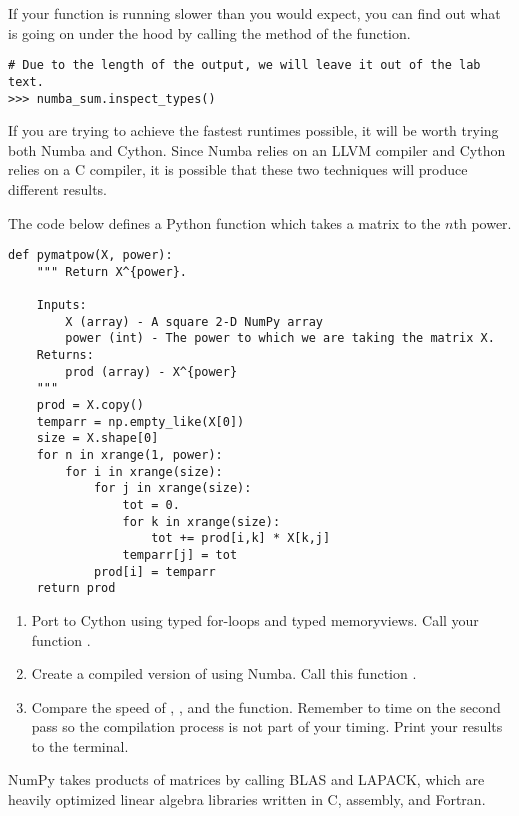 If your function is running slower than you would expect, you can find out what is going on under the hood by calling the  method of the function.

\begin{lstlisting}
# Due to the length of the output, we will leave it out of the lab text.
>>> numba_sum.inspect_types()
\end{lstlisting}

If you are trying to achieve the fastest runtimes possible, it will be worth trying both Numba and Cython. Since Numba relies on an LLVM compiler and Cython relies on a C compiler, it is possible that these two techniques will produce different results.

\begin{problem}
The code below defines a Python function which takes a matrix to the $n$th power.
\begin{lstlisting}
def pymatpow(X, power):
    """ Return X^{power}.

    Inputs:
        X (array) - A square 2-D NumPy array
        power (int) - The power to which we are taking the matrix X.
    Returns:
        prod (array) - X^{power}
    """
    prod = X.copy()
    temparr = np.empty_like(X[0])
    size = X.shape[0]
    for n in xrange(1, power):
        for i in xrange(size):
            for j in xrange(size):
                tot = 0.
                for k in xrange(size):
                    tot += prod[i,k] * X[k,j]
                temparr[j] = tot
            prod[i] = temparr
    return prod
\end{lstlisting}

\begin{enumerate}
\item Port  to Cython using typed for-loops and typed memoryviews. Call your function .
\item Create a compiled version of  using Numba. Call this function .
\item Compare the speed of , ,  and the  function. Remember to time  on the second pass so the compilation process is not part of your timing. Print your results to the terminal.
\end{enumerate}
NumPy takes products of matrices by calling BLAS and LAPACK, which are heavily optimized linear algebra libraries written in C, assembly, and Fortran.
\end{problem}

